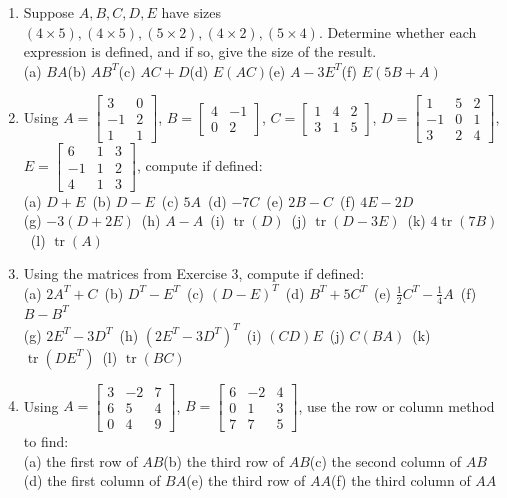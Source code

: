 \documentclass{article}
\theoremstyle{mystyle}
\begin{document}
\begin{enumerate}
    \item[1.] Suppose $A,B,C,D,E$ have sizes $(4\times5),(4\times5),(5\times2),(4\times2),(5\times4)$. Determine whether each expression is defined, and if so, give the size of the result.\\
    (a) $BA$\quad (b) $AB^T$\quad (c) $AC+D$\quad (d) $E(AC)$\quad (e) $A-3E^T$\quad (f) $E(5B+A)$

    \item[3.] Using $A=\begin{bmatrix}3&0\\-1&2\\1&1\end{bmatrix}$, $B=\begin{bmatrix}4&-1\\0&2\end{bmatrix}$, $C=\begin{bmatrix}1&4&2\\3&1&5\end{bmatrix}$, $D=\begin{bmatrix}1&5&2\\-1&0&1\\3&2&4\end{bmatrix}$, $E=\begin{bmatrix}6&1&3\\-1&1&2\\4&1&3\end{bmatrix}$, compute if defined:\\
    (a) $D+E$\ (b) $D-E$\ (c) $5A$\ (d) $-7C$\ (e) $2B-C$\ (f) $4E-2D$\\
    (g) $-3(D+2E)$\ (h) $A-A$\ (i) $\operatorname{tr}(D)$\ (j) $\operatorname{tr}(D-3E)$\ (k) $4\operatorname{tr}(7B)$\ (l) $\operatorname{tr}(A)$

    \item[4.] Using the matrices from Exercise 3, compute if defined:\\
    (a) $2A^T+C$\ (b) $D^T-E^T$\ (c) $(D-E)^T$\ (d) $B^T+5C^T$\ (e) $\tfrac12C^T-\tfrac14A$\ (f) $B-B^T$\\
    (g) $2E^T-3D^T$\ (h) $(2E^T-3D^T)^T$\ (i) $(CD)E$\ (j) $C(BA)$\ (k) $\operatorname{tr}(DE^T)$\ (l) $\operatorname{tr}(BC)$

    \item[7.] Using $A=\begin{bmatrix}3&-2&7\\6&5&4\\0&4&9\end{bmatrix}$, $B=\begin{bmatrix}6&-2&4\\0&1&3\\7&7&5\end{bmatrix}$, use the row or column method to find:\\
    (a) the first row of $AB$\quad (b) the third row of $AB$\quad (c) the second column of $AB$\\
    (d) the first column of $BA$\quad (e) the third row of $AA$\quad (f) the third column of $AA$


\end{enumerate}
\end{document}
